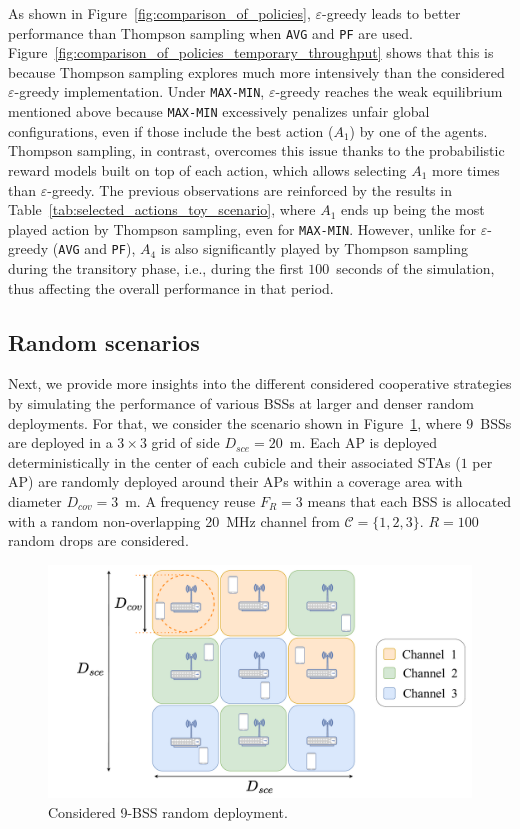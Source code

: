 As shown in Figure~\ref{fig:comparison_of_policies}, $\varepsilon$-greedy leads to better performance than Thompson sampling when \texttt{AVG} and \texttt{PF} are used. Figure~\ref{fig:comparison_of_policies_temporary_throughput} shows that this is because Thompson sampling explores much more intensively than the considered $\varepsilon$-greedy implementation. Under \texttt{MAX-MIN}, $\varepsilon$-greedy reaches the weak equilibrium mentioned above because \texttt{MAX-MIN} excessively penalizes unfair global configurations, even if those include the best action ($A_1$) by one of the agents. Thompson sampling, in contrast, overcomes this issue thanks to the probabilistic reward models built on top of each action, which allows selecting $A_1$ more times than $\varepsilon$-greedy. The previous observations are reinforced by the results in Table~\ref{tab:selected_actions_toy_scenario}, where $A_1$ ends up being the most played action by Thompson sampling, even for \texttt{MAX-MIN}. However, unlike for $\varepsilon$-greedy (\texttt{AVG} and \texttt{PF}), $A_4$ is also significantly played by Thompson sampling during the transitory phase, i.e., during the first $100$~seconds of the simulation, thus affecting the overall performance in that period.

\subsection{Random scenarios}

Next, we provide more insights into the different considered cooperative strategies by simulating the performance of various BSSs at larger and denser random deployments. For that, we consider the scenario shown in Figure~\ref{fig:randm_scenario}, where $9$~BSSs are deployed in a $3\times 3$ grid of side $D_{sce}=20$~m. Each AP is deployed deterministically in the center of each cubicle and their associated STAs ($1$ per AP) are randomly deployed around their APs within a coverage area with diameter $D_{cov}=3$~m. A frequency reuse $F_R = 3$ means that each BSS is allocated with a random non-overlapping 20~MHz channel from $\mathcal{C} = \{1,2,3\}$. $R=100$ random drops are considered.

\begin{figure}[ht!]
    \centering
    \includegraphics[width=\linewidth]{figures/random_scenario.pdf}
    \caption{Considered 9-BSS random deployment.}
    \label{fig:randm_scenario}
\end{figure}

